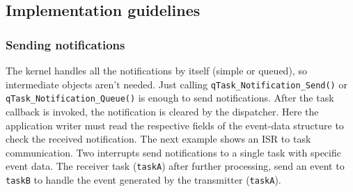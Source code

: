 \subsection{Implementation guidelines}
\subsubsection{Sending notifications}

The kernel handles all the notifications by itself (simple or queued), so intermediate objects aren't needed. Just calling \lstinline{qTask_Notification_Send()} or \lstinline{qTask_Notification_Queue()} is enough to send notifications. After the task callback is invoked, the notification is cleared by the dispatcher. Here the application writer must read the respective fields of the event-data structure to check the received notification. 
\medskip
The next example shows an ISR to task communication. Two interrupts send notifications to a single task with specific event data. The receiver task (\lstinline{taskA}) after further processing, send an event to \lstinline{taskB} to handle the event generated by the transmitter (\lstinline{taskA}).
\medskip

